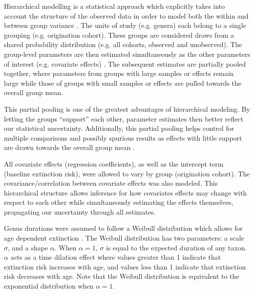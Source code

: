 \documentclass{article}
\begin{document}
Hierarchical modelling is a statistical approach which explicitly takes into account the structure of the observed data in order to model both the within and between group variance \citep{Gelman2013d,Gelman2007}. The units of study (e.g. genera) each belong to a single grouping (e.g. origination cohort). These groups are considered draws from a shared probability distribution (e.g. all cohorts, observed and unobserved). The group-level parameters are then estimated simultaneously as the other parameters of interest (e.g. covariate effects) \citep{Gelman2013d}. The subsequent estimates are partially pooled together, where parameters from groups with large samples or effects remain large while those of groups with small samples or effects are pulled towards the overall group mean. 

This partial pooling is one of the greatest advantages of hierarchical modeling. By letting the groups ``support'' each other, parameter estimates then better reflect our statistical uncertainty. Additionally, this partial pooling helps control for multiple comparisons and possibly spurious results as effects with little support are drawn towards the overall group mean \citep{Gelman2013d,Gelman2007}. 

All covariate effects (regression coefficients), as well as the intercept term (baseline extinction risk), were allowed to vary by group (origination cohort). The covariance/correlation between covariate effects was also modeled. This hierarchical structure allows inference for how covariates effects may change with respect to each other while simultaneously estimating the effects themselves, propagating our uncertainty through all estimates. 

Genus durations were assumed to follow a Weibull distribution which allows for age dependent extinction \citep{Klein2003}. The Weibull distribution has two parameters: a scale \(\sigma\), and a shape \(\alpha\). When \(\alpha = 1\), \(\sigma\) is equal to the expected duration of any taxon. \(\alpha\) acts as a time dilation effect where values greater than 1 indicate that extinction risk increases with age, and values less than 1 indicate that extinction risk decreases with age. Note that the Weibull distribution is equivalent to the exponential distribution when \(\alpha = 1\). 
\end{document}
